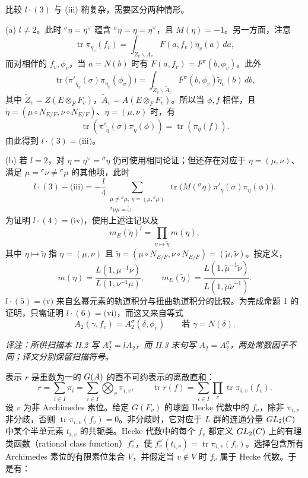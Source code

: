 比较 $l\cdot(3)$ 与 (iii) 稍复杂，需要区分两种情形。

(a) $l\ne2$。此时 ${}^\sigma\eta=\eta^\vee$ 蕴含 ${}^\sigma\eta=\eta=\eta^\vee$，且 $M(\eta)=-1$。另一方面，注意
\[
 \operatorname{tr}\pi_{\eta_v}(f_v)
 =\int_{Z_v\backslash A_v}F(a,f_v)\eta_v(a)\,da,
\]
而对相伴的 $f_v,\phi_v$，当 $a=N(b)$ 时有 $F(a,f_v)=F^\sigma(b,\phi_v)$。此外
\[
 \operatorname{tr}\bigl(\pi'_{\widetilde\eta_v}(\sigma)
 \pi_{\widetilde\eta_v}(\phi_v)\bigr)
 =\int_{\widetilde Z_v\backslash\widetilde A_v}
 F^\sigma(b,\phi_v)\widetilde\eta_v(b)\,db,
\]
其中 $\widetilde Z_v=Z(E\otimes_FF_v)$，$\widetilde A_v=A(E\otimes_FF_v)$。所以当 $\phi,f$ 相伴，且 $\widetilde\eta=(\mu\circ N_{E/F},\nu\circ N_{E/F})$、$\eta=(\mu,\nu)$ 时，有
\[
 \operatorname{tr}(\pi'_{\widetilde\eta}(\sigma)\pi_{\widetilde\eta}(\phi))
 =\operatorname{tr}(\pi_\eta(f)).
\]
由此得到 $l\cdot(3)=\text{(iii)}$。

(b) 若 $l=2$，对 $\eta=\eta^\vee={}^\sigma\eta$ 仍可使用相同论证；但还存在对应于 $\eta=(\mu,\nu)$、满足 $\mu={}^\sigma\nu\ne{}^\sigma\mu$ 的其他项，此时
\[
 l\cdot(3)-\text{(iii)}
 =-\frac l4\sum_{\substack{\mu\ne{}^\sigma\mu,\ \eta=(\mu,{}^\sigma\mu)\\{}^\sigma\mu\mu=\widetilde\omega}}
 \operatorname{tr}\bigl(M({}^\sigma\eta)\pi'_\eta(\sigma)\pi_\eta(\phi)\bigr).
\]
为证明 $l\cdot(4)=\text{(iv)}$，使用上述注记以及
\[
 m_E(\widetilde\eta)^l=\prod_{\eta\mapsto\widetilde\eta}m(\eta),
\]
其中 $\eta\mapsto\widetilde\eta$ 指 $\eta=(\mu,\nu)$ 且 $\widetilde\eta=(\mu\circ N_{E/F},\nu\circ N_{E/F})=(\widetilde\mu,\widetilde\nu)$。按定义，
\[
 m(\eta)=\frac{L(1,\mu^{-1}\nu)}{L(1,\nu^{-1}\mu)},
 \qquad m_E(\widetilde\eta)=\frac{L(1,\widetilde\mu^{-1}\widetilde\nu)}
 {L(1,\widetilde\mu\widetilde\nu^{-1})}.
\]
$l\cdot(5)=\text{(v)}$ 来自幺幂元素的轨道积分与扭曲轨道积分的比较。为完成命题 1 的证明，只需证明 $l\cdot(6)=\text{(vi)}$，而这又来自等式
\[
 A_2(\gamma,f_v)=A_2^\sigma(\delta,\phi_v)\qquad\text{若 }\gamma=N(\delta).
\]

\noindent\emph{译注：所供扫描本 II.2 写 $A_2^\sigma=lA_2$，而 II.3 末句写 $A_2=A_2^\sigma$，两处常数因子不同；译文分别保留扫描符号。}

表示 $r$ 是重数为一的 $G(A)$ 的酉不可约表示的离散直和：
\[
 r=\sum_{i\in I}\pi_i=\sum_{i\in I}\bigotimes_v\pi_{i,v},
 \qquad\operatorname{tr}r(f)=\sum_{i\in I}\prod_v\operatorname{tr}\pi_{i,v}(f_v).
\]
设 $v$ 为非 Archimedes 素位。给定 $G(F_v)$ 的球面 Hecke 代数中的 $f_v$，除非 $\pi_{i,v}$ 非分歧，否则 $\operatorname{tr}\pi_{i,v}(f_v)=0$。非分歧时，它对应于 $L$ 群的连通分量 $GL_2(C)$ 中某个半单元素 $t_{i,v}$ 的共轭类。Hecke 代数中的每个 $f_v$ 都定义 $GL_2(C)$ 上的有理类函数（rational class function）$f_v^\vee$，使 $f_v^\vee(t_{i,v})=\operatorname{tr}\pi_{i,v}(f_v)$。选择包含所有 Archimedes 素位的有限素位集合 $V$，并假定当 $v\notin V$ 时 $f_v$ 属于 Hecke 代数。于是有：


